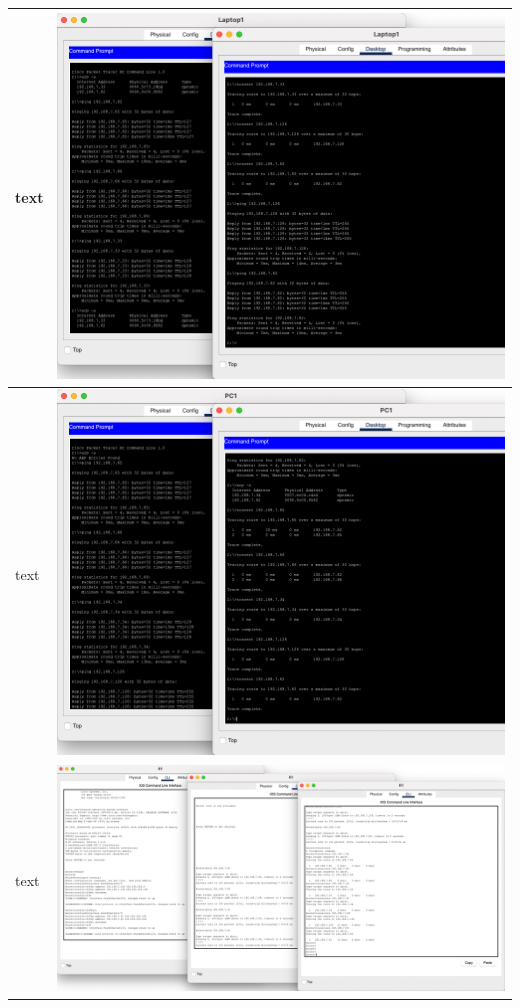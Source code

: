 \documentclass[11pt,a4paper]{report}
\begin{document}
\begin{flushleft}
\begin{center}
\begin{longtable}{ m{5cm} l }
                        text & \includegraphics[scale=0.34,valign=c]{phase2/images/p2-connecting2lanswithrouter/Laptop1_cmdall} \\ \hline
                        text & \includegraphics[scale=0.34,valign=c]{phase2/images/p2-connecting2lanswithrouter/PC1_cmdall} \\ \hline
                        text & \includegraphics[scale=0.202,valign=c]{phase2/images/p2-connecting2lanswithrouter/R1-cliall} \\ \hline


\end{longtable}
\end{center}
\end{flushleft}
\end{document}
